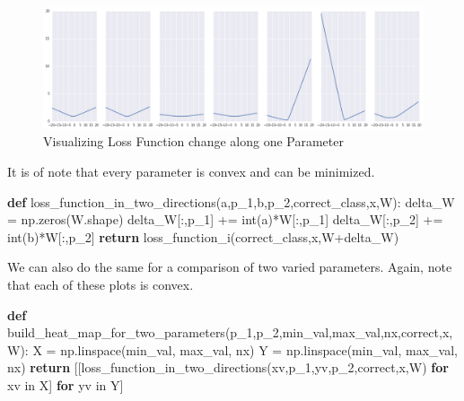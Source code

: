 \documentclass[]{report}
\newenvironment{Shaded}{}{}
\newcommand{\KeywordTok}[1]{\textcolor[rgb]{0.00,0.44,0.13}{\textbf{{#1}}}}
\newcommand{\ControlFlowTok}[1]{\textcolor[rgb]{0.00,0.44,0.13}{\textbf{{#1}}}}
\newcommand{\OperatorTok}[1]{\textcolor[rgb]{0.40,0.40,0.40}{{#1}}}
\newcommand{\BuiltInTok}[1]{{#1}}
\newcommand{\NormalTok}[1]{{#1}}
\begin{document}
\begin{figure}[htbp]
\centering
\includegraphics{assets/img/loss_function_one_param.png}
\caption{Visualizing Loss Function change along one Parameter}
\end{figure}

It is of note that every parameter is convex and can be minimized.

\begin{Shaded}
\begin{Highlighting}[]
\KeywordTok{def} \NormalTok{loss_function_in_two_directions(a,p_1,b,p_2,correct_class,x,W):}
    \NormalTok{delta_W }\OperatorTok{=} \NormalTok{np.zeros(W.shape)}
    \NormalTok{delta_W[:,p_1] }\OperatorTok{+=} \BuiltInTok{int}\NormalTok{(a)}\OperatorTok{*}\NormalTok{W[:,p_1]}
    \NormalTok{delta_W[:,p_2] }\OperatorTok{+=} \BuiltInTok{int}\NormalTok{(b)}\OperatorTok{*}\NormalTok{W[:,p_2]}
    \ControlFlowTok{return} \NormalTok{loss_function_i(correct_class,x,W}\OperatorTok{+}\NormalTok{delta_W)}

\end{Highlighting}
\end{Shaded}

We can also do the same for a comparison of two varied parameters.
Again, note that each of these plots is convex.

\begin{Shaded}
\begin{Highlighting}[]
\KeywordTok{def} \NormalTok{build_heat_map_for_two_parameters(p_1,p_2,min_val,max_val,nx,correct,x,W):}
    \NormalTok{X }\OperatorTok{=} \NormalTok{np.linspace(min_val, max_val, nx)}
    \NormalTok{Y }\OperatorTok{=} \NormalTok{np.linspace(min_val, max_val, nx)}
    \ControlFlowTok{return} \NormalTok{[[loss_function_in_two_directions(xv,p_1,yv,p_2,correct,x,W)}
             \ControlFlowTok{for} \NormalTok{xv }\OperatorTok{in} \NormalTok{X]}
            \ControlFlowTok{for} \NormalTok{yv }\OperatorTok{in} \NormalTok{Y]}
\end{Highlighting}
\end{Shaded}
\end{document}

